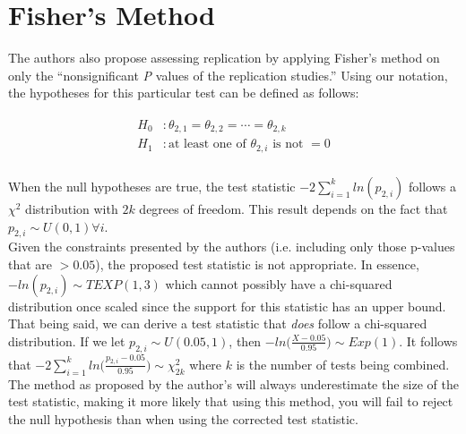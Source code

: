 \documentclass{article}
\begin{document}
\section{Fisher's Method}

The authors also propose assessing replication by applying Fisher's method on only the ``nonsignificant \textit{P} values of the replication studies.'' Using our notation, the hypotheses for this particular test can be defined as follows:

\begin{align}
\begin{split}
H_0&: \theta_{2,1} = \theta_{2,2} = \cdots = \theta_{2,k} \\
H_1&: \text{at least one of } \theta_{2,i} \text{ is not } = 0 \\
\end{split}
\end{align}

When the null hypotheses are true, the test statistic $-2\sum\limits_{i=1}^k ln(p_{2,i})$ follows a $\chi^2$ distribution with $2k$ degrees of freedom. This result depends on the fact that $p_{2,i} \sim U(0,1) \forall i$.
\\

Given the constraints presented by the authors (i.e. including only those p-values that are $> 0.05$), the proposed test statistic is not appropriate. In essence, $-ln(p_{2,i}) \sim TEXP(1,3)$ which cannot possibly have a chi-squared distribution once scaled since the support for this statistic has an upper bound. That being said, we can derive a test statistic that \textit{does} follow a chi-squared distribution. If we let $p_{2,i} \sim U(0.05,1)$, then $- ln\Big ( \frac{X-0.05}{0.95} \Big ) \sim Exp(1)$. It follows that $-2 \sum\limits_{i=1}^k ln \Big ( \frac{p_{2,i} - 0.05}{0.95} \Big ) \sim \chi^2_{2k}$ where $k$ is the number of tests being combined. The method as proposed by the author's will always underestimate the size of the test statistic, making it more likely that using this method, you will fail to reject the null hypothesis than when using the corrected test statistic.
\end{document}
